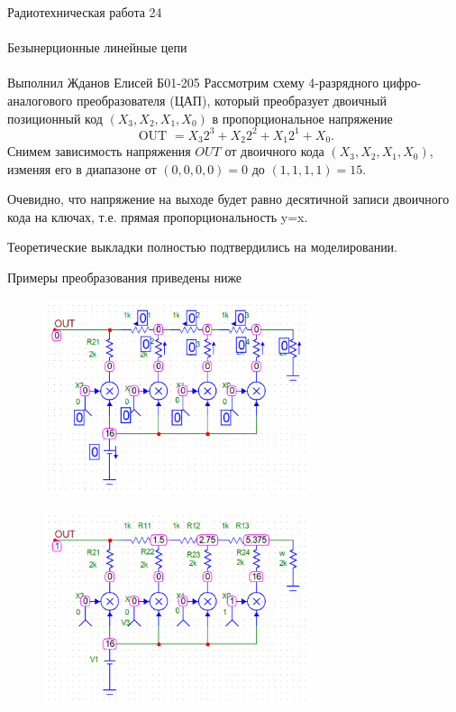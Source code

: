 \documentclass{astroedu-lab}
\begin{document}
\begin{problem}{\huge Радиотехническая работа 24\\\\Безынерционные линейные цепи\\\\Выполнил Жданов Елисей Б01-205}
Рассмотрим схему 4-разрядного цифро-аналогового преобразователя (ЦАП), который преобразует двоичный позиционный код $\left(X_3, X_2, X_1, X_0\right)$ в пропорциональное напряжение
$$
\text { OUT }=X_3 2^3+X_2 2^2+X_1 2^1+X_0 .
$$
Снимем зависимость напряжения $O U T$ от двоичного кода $\left(X_3, X_2, X_1, X_0\right)$, изменяя его в диапазоне от $(0,0,0,0)=0$ до $(1,1,1,1)=15$.

Очевидно, что напряжение на выходе будет равно десятичной записи двоичного кода на ключах, т.е. прямая пропорциональность y=x.

Теоретические выкладки полностью подтвердились на моделировании.

Примеры преобразования приведены ниже

\begin{figure}[!h]
	\centering
	\includegraphics[width=0.7\textwidth]{19e.png}
	\label{fig:boiler}
\end{figure}

\begin{figure}[!h]
	\centering
	\includegraphics[width=0.7\textwidth]{19g.png}
	\label{fig:boiler}
\end{figure}


\end{problem}
\end{document}
